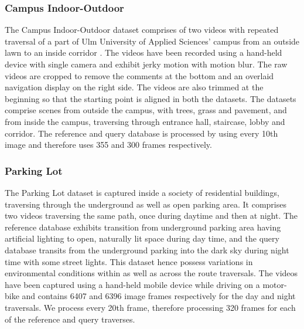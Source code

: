 \documentclass[letterpaper, 10 pt, conference]{ieeeconf}  %
\begin{document}
\subsubsection{Campus Indoor-Outdoor}
The Campus Indoor-Outdoor dataset comprises of two videos with repeated traversal of a part of Ulm University of Applied Sciences' campus from an outside lawn to an inside corridor \cite{indoorOutdoor1}. The videos have been recorded using a hand-held device with single camera and exhibit jerky motion with motion blur. The raw videos are cropped to remove the comments at the bottom and an overlaid navigation display on the right side. The videos are also trimmed at the beginning so that the starting point is aligned in both the datasets. The datasets comprise scenes from outside the campus, with trees, grass and pavement, and from inside the campus, traversing through entrance hall, staircase, lobby and corridor. The reference and query database is processed by using every 10th image and therefore uses 355 and 300 frames respectively.

\subsubsection{Parking Lot}
The Parking Lot dataset is captured inside a society of residential buildings, traversing through the underground as well as open parking area. It comprises two videos traversing the same path, once during daytime and then at night. The reference database exhibits transition from underground parking area having artificial lighting to open, naturally lit space during day time, and the query database transits from the underground parking into the dark sky during night time with some street lights. This dataset hence possess variations in environmental conditions within as well as across the route traversals. The videos have been captured using a hand-held mobile device while driving on a motor-bike and contains 6407 and 6396 image frames respectively for the day and night traversals. We process every 20th frame, therefore processing 320 frames for each of the reference and query traverses.
\end{document}
